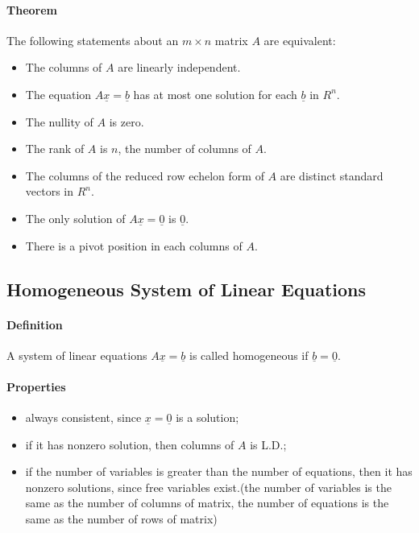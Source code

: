 \documentclass[12pt]{article}
\begin{document}
\paragraph{Theorem}
The following statements about an $m \times n$ matrix $A$ are equivalent:
\begin{itemize}
\item The columns of $A$ are linearly independent.
\item The equation $A\underline{x}=\underline{b}$ has at most one solution for each $\underline{b}$ in $R^n$.
\item The nullity of $A$ is zero.
\item The rank of $A$ is $n$, the number of columns of $A$.
\item The columns of the reduced row echelon form of $A$ are distinct standard vectors in $R^n$.
\item The only solution of $A\underline{x}=\underline{0}$ is $\underline{0}$.
\item There is a pivot position in each columns of $A$.
\end{itemize}

\subsection{Homogeneous System of Linear Equations}
\paragraph{Definition}
A system of linear equations $A\underline{x}=\underline{b}$ is called homogeneous if $\underline{b}=\underline{0}$.
\paragraph{Properties}
\begin{itemize}
\item always consistent, since $\underline{x}=\underline{0}$ is a solution;
\item if it has nonzero solution, then columns of $A$ is L.D.;
\item if the number of variables is greater than the number of equations, then it has nonzero solutions, since free variables exist.(the number of variables is the same as the number of columns of matrix, the number of equations is the same as the number of rows of matrix)
\end{itemize}
\end{document}
